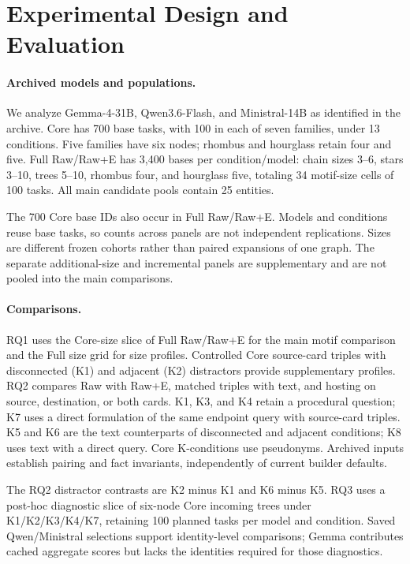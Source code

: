 \section{Experimental Design and Evaluation}
\label{sec:setup}
\paragraph{Archived models and populations.}
We analyze Gemma-4-31B, Qwen3.6-Flash, and Ministral-14B as identified in the archive. Core has 700 base tasks, with 100 in each of seven families, under 13 conditions. Five families have six nodes; rhombus and hourglass retain four and five. Full Raw/Raw+E has 3,400 bases per condition/model: chain sizes 3--6, stars 3--10, trees 5--10, rhombus four, and hourglass five, totaling 34 motif-size cells of 100 tasks. All main candidate pools contain 25 entities.

The 700 Core base IDs also occur in Full Raw/Raw+E. Models and conditions reuse base tasks, so counts across panels are not independent replications. Sizes are different frozen cohorts rather than paired expansions of one graph. The separate additional-size and incremental panels are supplementary and are not pooled into the main comparisons.

\paragraph{Comparisons.}
RQ1 uses the Core-size slice of Full Raw/Raw+E for the main motif comparison and the Full size grid for size profiles. Controlled Core source-card triples with disconnected (K1) and adjacent (K2) distractors provide supplementary profiles. RQ2 compares Raw with Raw+E, matched triples with text, and hosting on source, destination, or both cards. K1, K3, and K4 retain a procedural question; K7 uses a direct formulation of the same endpoint query with source-card triples. K5 and K6 are the text counterparts of disconnected and adjacent conditions; K8 uses text with a direct query. Core K-conditions use pseudonyms. Archived inputs establish pairing and fact invariants, independently of current builder defaults.

The RQ2 distractor contrasts are K2 minus K1 and K6 minus K5. RQ3 uses a post-hoc diagnostic slice of six-node Core incoming trees under K1/K2/K3/K4/K7, retaining 100 planned tasks per model and condition. Saved Qwen/Ministral selections support identity-level comparisons; Gemma contributes cached aggregate scores but lacks the identities required for those diagnostics.


